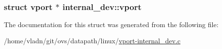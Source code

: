 \subsubsection[{vport}]{\setlength{\rightskip}{0pt plus 5cm}struct {\bf vport} $\ast$ internal\+\_\+dev\+::vport}\label{structinternal__dev_ad571bd9420f8b95ac7d1febc36c6ef45}


The documentation for this struct was generated from the following file\+:\begin{DoxyCompactItemize}
\item 
/home/vladn/git/ovs/datapath/linux/\hyperlink{linux_2vport-internal__dev_8c}{vport-\/internal\+\_\+dev.\+c}\end{DoxyCompactItemize}
